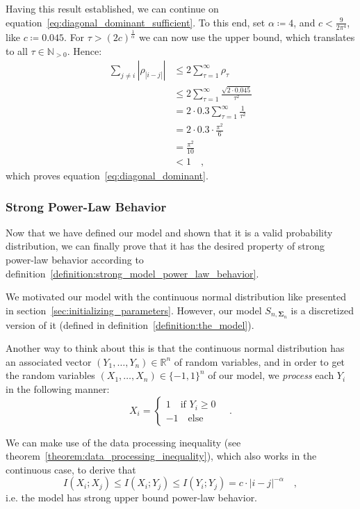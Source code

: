 \documentclass[../../main.tex]{subfiles}
\begin{document}
Having this result established, we can continue on equation~\eqref{eq:diagonal_dominant_sufficient}. To this end, set $\alpha \coloneqq 4$, and $c < \frac{9}{2 \pi^4}$, like $c \coloneqq 0.045$. For $\tau > (2c)^{\frac{1}{\alpha}}$ we can now use the upper bound, which translates to all $\tau \in \mathbb{N}_{>0}$. Hence:
\begin{align*}
    \sum_{j \neq i} |\rho_{|i-j|}| &\leq 2 \sum_{\tau = 1}^{\infty} \rho_\tau \\
    &\leq 2 \sum_{\tau = 1}^{\infty} \frac{\sqrt{2 \cdot 0.045}}{\tau^2} \\
    &= 2 \cdot 0.3 \sum_{\tau = 1}^{\infty} \frac{1}{\tau^2} \\
    &= 2 \cdot 0.3 \cdot \frac{\pi^2}{6} \\
    &= \frac{\pi^2}{10} \\
    &< 1 \quad ,
\end{align*}
which proves equation~\eqref{eq:diagonal_dominant}.

\subsubsection{Strong Power-Law Behavior}
Now that we have defined our model and shown that it is a valid probability distribution, we can finally prove that it has the desired property of strong power-law behavior according to definition~\ref{definition:strong_model_power_law_behavior}.

We motivated our model with the continuous normal distribution like presented in section~\ref{sec:initializing_parameters}. However, our model $S_{n, \bm{\Sigma}_n}$ is a discretized version of it (defined in definition~\ref{definition:the_model}). 

Another way to think about this is that the continuous normal distribution has an associated vector $(Y_1, \dots, Y_n) \in \mathbb{R}^n$ of random variables, and in order to get the random variables $(X_1, \dots, X_n) \in \{-1, 1\}^n$ of our model, we \emph{process} each $Y_i$ in the following manner:
\[
    X_i = \begin{cases}
        1 \quad \text{if } Y_i \geq 0 \\
        -1 \quad \text{else}
    \end{cases}
    \quad .
\]

We can make use of the data processing inequality (see theorem~\ref{theorem:data_processing_inequality}), which also works in the continuous case, to derive that
\[
    I(X_i; X_j) \leq I(X_i; Y_j) \leq I(Y_i; Y_j) = c \cdot |i - j|^{-\alpha}\quad ,
\]
i.e. the model has strong upper bound power-law behavior.
\end{document}
